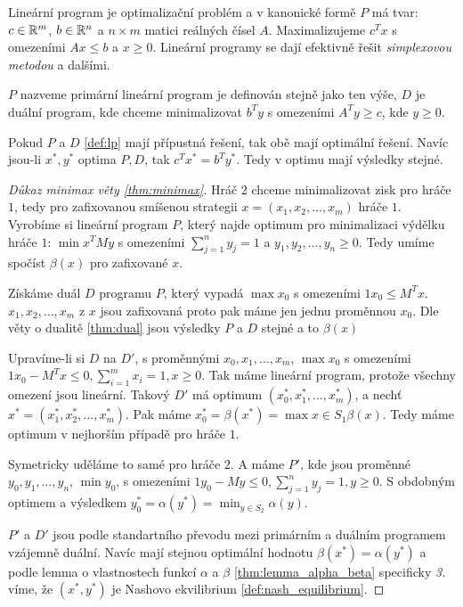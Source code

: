 \begin{definition}
\label{def:lp}
Lineární program je optimalizační problém a v kanonické formě $P$ má tvar: $c \in \mathbb{R}^m$, $b \in \mathbb{R}^n$ a $n \times m$ matici reálných čísel $A$. Maximalizujeme $c^T x$ s omezeními $Ax \leq b$ a $x \geq 0$. 
Lineární programy se dají efektivně řešit \textit{simplexovou metodou} a dalšími.

$P$ nazveme primární lineární program je definován stejně jako ten výše, $D$ je duální program, kde chceme minimalizovat $b^T y$ s omezeními $A^T y \geq c$, kde $y \geq 0$. 
\end{definition} 
\begin{theorem}
\label{thm:dual}
Pokud $P$ a $D$ \ref{def:lp} mají přípustná řešení, tak obě mají optimální řešení. 
Navíc jsou-li $x^*, y^*$ optima $P,D$, tak $c^T x^* = b^T y^*$. 
Tedy v optimu mají výsledky stejné. 
\end{theorem}
\begin{proof}[Důkaz minimax věty \ref{thm:minimax}]
Hráč $2$ chceme minimalizovat zisk pro hráče $1$, tedy pro zafixovanou smíšenou strategii $x=(x_1,x_2, \dots, x_m)$ hráče $1$. 
Vyrobíme si lineární program $P$, který najde optimum pro minimalizaci výdělku hráče $1$: $\min x^T M y$ s omezeními $\sum^n_{j=1} y_j = 1$ a $y_1, y_2, \dots, y_n \geq 0$. 
Tedy umíme spočíst $\beta(x)$ pro zafixované $x$. 

Získáme duál $D$ programu $P$, který vypadá $\max x_0$ s omezeními $1x_0 \leq M^T x$. 
$x_1,x_2, \dots, x_m$ z $x$ jsou zafixovaná proto pak máme jen jednu proměnnou $x_0$. 
Dle věty o dualitě \ref{thm:dual} jsou výsledky $P$ a $D$ stejné a to $\beta(x)$

Upravíme-li si $D$ na $D'$, s proměnnými $x_0, x_1, \dots, x_m$, $\max x_0$ s omezeními $1x_0 - M^T x \leq 0, \sum^m_{i=1}x_i = 1, x\geq 0 $. 
Tak máme lineární program, protože všechny omezení jsou lineární. 
Takový $D'$ má optimum $(x_0^*, x_1^*, \dots, x_m^*)$, a nechť $x^* = (x_1^*, x_2^*, \dots, x_m^*)$. 
Pak máme $x_0^* = \beta(x^*) = \max{x\in S_1} \beta(x)$. 
Tedy máme optimum v nejhorším případě pro hráče $1$.

Symetricky uděláme to samé pro hráče $2$. A máme $P'$, kde jsou proměnné $y_0, y_1, \dots, y_n$, $\min y_0$, s omezeními $1y_0 - My \leq 0, \sum^n_{j=1} y_j = 1, y \geq 0$. 
S obdobným optimem a výsledkem $y_0^* = \alpha(y^*) = \min_{y \in S_2} \alpha(y)$. 

$P'$ a $D'$ jsou podle standartního převodu mezi primárním a duálním programem vzájemně duální. 
Navíc mají stejnou optimální hodnotu $\beta(x^*) = \alpha(y^*)$ a podle lemma o vlastnostech funkcí $\alpha$ a $\beta$ \ref{thm:lemma_alpha_beta} specificky \textit{3.} víme, že $(x^*, y^*)$ je Nashovo ekvilibrium \ref{def:nash_equilibrium}.  

\end{proof}
